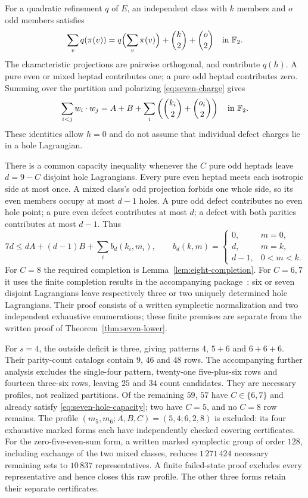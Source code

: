 For a quadratic refinement $q$ of $E$, an independent class with
$k$ members and $o$ odd members satisfies
\[
\sum_v q(\pi(v))
 =q\Bigl(\sum_v\pi(v)\Bigr)+\binom{k}{2}+\binom{o}{2}
 \quad\text{in }\mathbb F_2.
\]
The characteristic projections are pairwise orthogonal, and
contribute $q(h)$. A pure even or mixed heptad contributes one;
a pure odd heptad contributes zero. Summing over the partition
and polarizing \eqref{eq:seven-charge} gives
\begin{equation}\label{eq:seven-quadratic-charge}
\sum_{i<j} w_i\cdot w_j
 =A+B+\sum_i\left(\binom{k_i}{2}+\binom{o_i}{2}\right)
 \quad\text{in }\mathbb F_2.
\end{equation}
These identities allow $h=0$ and do not assume that individual
defect charges lie in a hole Lagrangian.

There is a common capacity inequality whenever the $C$ pure
odd heptads leave $d=9-C$ disjoint hole Lagrangians. Every
pure even heptad meets each isotropic side at most once. A mixed
class's odd projection forbids one whole side, so its even members
occupy at most $d-1$ holes. A pure odd defect contributes no even
hole point; a pure even defect contributes at most $d$; a defect
with both parities contributes at most $d-1$. Thus
\begin{equation}\label{eq:seven-hole-capacity}
7d\leq dA+(d-1)B+\sum_i b_d(k_i,m_i),\qquad
b_d(k,m)=
\begin{cases}
0,&m=0,\\
d,&m=k,\\
d-1,&0<m<k.
\end{cases}
\end{equation}
For $C=8$ the required completion is
Lemma~\ref{lem:eight-completion}. For $C=6,7$ it uses the finite
completion results in the accompanying package~\cite{Package}:
six or seven disjoint Lagrangians leave respectively three or two
uniquely determined hole Lagrangians. Their proof consists of
a written symplectic normalization and two independent exhaustive
enumerations; these finite premises are separate from the written
proof of Theorem~\ref{thm:seven-lower}.

For $s=4$, the outside deficit is three, giving patterns $4$,
$5+6$ and $6+6+6$. Their parity-count catalogs contain $9$, $46$
and $48$ rows. The accompanying further analysis excludes the
single-four pattern, twenty-one five-plus-six rows and fourteen three-six
rows, leaving $25$ and $34$ count candidates. They are necessary
profiles, not realized partitions. Of the remaining $59$, $57$
have $C\in\{6,7\}$ and already satisfy
\eqref{eq:seven-hole-capacity}; two have $C=5$, and no $C=8$ row remains.
The profile
$(m_5,m_6;A,B,C)=(5,4;6,2,8)$ is excluded: its four exhaustive
marked forms each have independently checked covering certificates.
For the zero-five-even-sum form, a written marked symplectic group
of order $128$, including exchange of the two mixed classes, reduces
$1\,271\,424$ necessary remaining sets to $10\,837$ representatives.
A finite failed-state proof excludes every representative and hence
closes this raw profile. The other three forms retain their separate
certificates.


